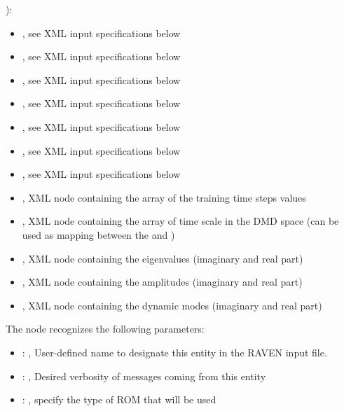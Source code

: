   ):     \begin{itemize}       \item {}, see XML input
  specifications below       \item {}, see XML input specifications below
  \item {}, see XML input specifications below       \item {}, see XML input
  specifications below       \item {}, see XML input specifications below
  \item {}, see XML input specifications below       \item {},
  see XML input specifications below       \item {}, XML node containing the array
  of the training time steps values       \item {}, XML node containing the
  array of time scale in the DMD space (can be used as mapping       between the
   and )       \item {}, XML node containing
  the eigenvalues (imaginary and real part)       \item {}, XML node containing
  the amplitudes (imaginary and real part)       \item {}, XML node containing the
  dynamic modes (imaginary and real part)     \end{itemize}

  The  node recognizes the following parameters:
    \begin{itemize}
      \item {}: ,
        User-defined name to designate this entity in the RAVEN input file.
      \item {}: ,
        Desired verbosity of messages coming from this entity
      \item {}: ,
        specify the type of ROM that will be used
  \end{itemize}

